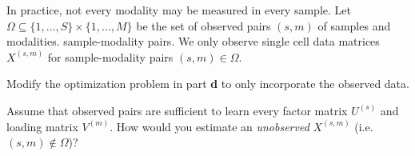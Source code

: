 \documentclass[12pt]{article}
\begin{document}
\begin{subquestions}
\item
In practice, not every modality may be measured in every sample.
Let $\Omega \subseteq \{1, \ldots, S\} \times \{1, \ldots, M\}$ be the set of observed pairs $(s,m)$ of samples and modalities. sample-modality pairs. We only observe single cell data matrices $X^{(s,m)}$ for sample-modality pairs $(s,m) \in \Omega$.

Modify the optimization problem in part \textbf{d} to only incorporate the observed data.

\item
Assume that observed pairs are sufficient to learn every factor matrix $U^{(s)}$ and loading matrix $V^{(m)}$. How would you estimate an \emph{unobserved} $X^{(s,m)}$ (i.e. $(s,m) \notin \Omega$)?
\end{subquestions}
\end{document}
